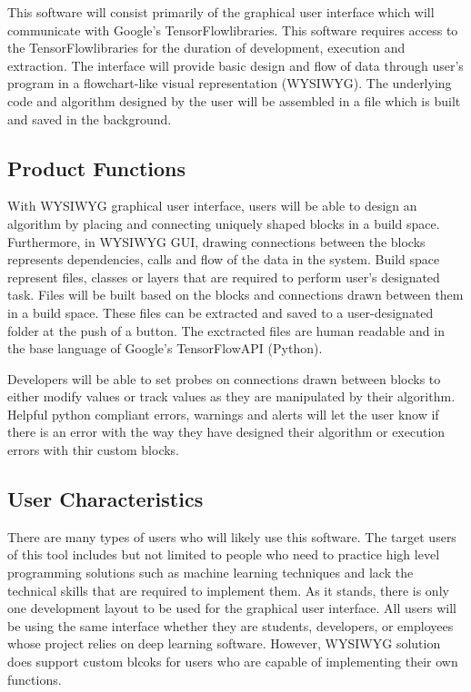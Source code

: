 \documentclass[journal,10pt,onecolumn,compsoc]{IEEEtran} \usepackage[margin=1.0in]{geometry} \usepackage{pdfpages} \usepackage{graphicx}
\begin{document}
This software will consist primarily of the graphical user interface which will communicate with Google's TensorFlow\texttrademark libraries. 
This software requires access to the TensorFlow\texttrademark libraries for the duration of development, execution and extraction. 
The interface will provide basic design and flow of data through user's program in a flowchart-like visual representation (WYSIWYG).
The underlying code and algorithm designed by the user will be assembled in a file which is built and saved in the background. 

\subsection{Product Functions}

With WYSIWYG graphical user interface, users will be able to design an algorithm by placing and connecting uniquely shaped blocks in a build space.
Furthermore, in WYSIWYG GUI, drawing connections between the blocks represents dependencies, calls and flow of the data in the system.
Build space represent files, classes or layers that are required to perform user's designated task.
Files will be built based on the blocks and connections drawn between them in a build space.
These files can be extracted and saved to a user-designated folder at the push of a button.
The exctracted files are human readable and in the base language of Google's TensorFlow\texttrademark API (Python).

Developers will be able to set probes on connections drawn between blocks to either modify values or track values as they are manipulated by their algorithm.
Helpful python compliant errors, warnings and alerts will let the user know if there is an error with the way they have designed their algorithm or execution errors with thir custom blocks.

\subsection{User Characteristics}

There are many types of users who will likely use this software. 
The target users of this tool includes but not limited to people who need to practice high level programming solutions such as machine learning techniques and lack the technical skills that are required to implement them.
As it stands, there is only one development layout to be used for the graphical user interface.
All users will be using the same interface whether they are students, developers, or employees whose project relies on deep learning software. 
However, WYSIWYG solution does support custom blcoks for users who are capable of implementing their own functions.
\end{document}
